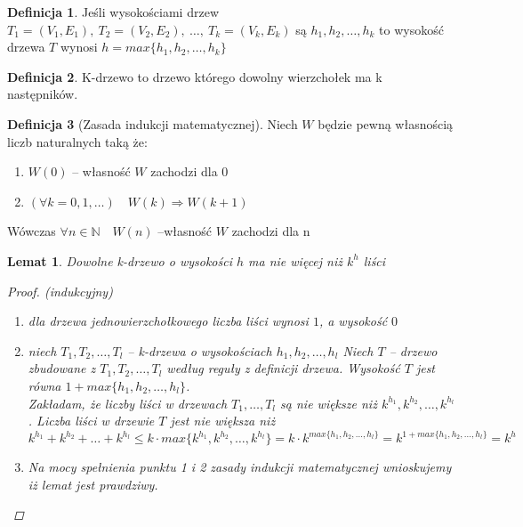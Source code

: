 \documentclass[12pt,a4paper]{article}
\newtheorem{lemat}{Lemat}
\theoremstyle{definition}
\newtheorem{df}{Definicja}
\theoremstyle{remark}
\begin{document}
	\begin{df}
		Jeśli wysokościami drzew $T_1 = (V_1, E_1), ~ T_2 = (V_2, E_2), ~\dots ,~ T_k = (V_k, E_k)$ są $h_1, h_2, \dots , h_k$ to
		wysokość drzewa $T$ wynosi $h = max\{h_1, h_2, \dots , h_k\}$
	\end{df}
	
	\begin{df}
		K-drzewo to drzewo którego dowolny wierzchołek ma k następników.
	\end{df}
	
	\begin{df}[Zasada indukcji matematycznej]
		Niech $W$ będzie pewną własnością liczb naturalnych taką że:
		\begin{enumerate}
			\item $W(0)$ -- własność $W$ zachodzi dla $0$
			\item $(\forall k=0, 1, \dots) \quad W(k) \Rightarrow W(k+1)$ 
		\end{enumerate}
		Wówczas $\forall n \in \mathbb{N} \quad W(n)$ --własność $W$ zachodzi dla n
	\end{df}
	
	\begin{lemat}
		Dowolne k-drzewo o wysokości $h$ ma nie więcej niż $k^h$ liści
		\begin{proof} (\emph{indukcyjny})\\
			\begin{enumerate}
				\item dla drzewa jednowierzchołkowego liczba liści wynosi $1$, a wysokość $0$
				\item niech $T_1, T_2, \dots, T_l$ -- k-drzewa o wysokościach $h_1, h_2, \dots, h_l$
				Niech $T$ -- drzewo zbudowane z $T_1, T_2, \dots, T_l$ według reguły z definicji drzewa. 
				Wysokość $T$ jest równa $1 + max\{h_1, h_2, \dots, h_l\}$.\\
				Zakładam, że liczby liści w drzewach $T_1, \dots, T_l$ są nie większe niż $k^{h_1}, k^{h_2}, \dots, k^{h_l}$. 
				Liczba liści w drzewie $T$ jest nie większa niż 
				$$k^{h_1} + k^{h_2} + \dots + k^{h_l} \leqslant k\cdot max\{k^{h_1}, k^{h_2}, \dots, k^{h_l}\} = k\cdot k^{max\{h_1, h_2, \dots, h_l\}} 
				= k^{1 + max\{h_1, h_2, \dots, h_l\}} = k^h$$
				\item Na mocy spełnienia punktu 1 i 2 zasady indukcji matematycznej wnioskujemy iż lemat jest prawdziwy.
			\end{enumerate}
		\end{proof}
	\end{lemat}
	
\end{document}
